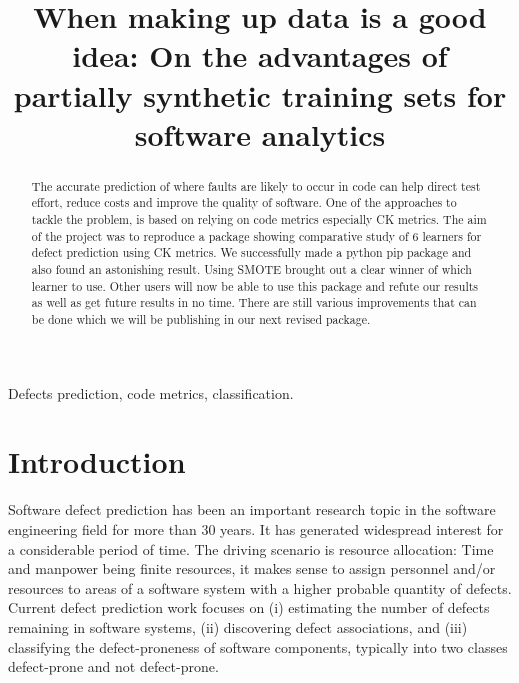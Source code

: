\documentclass[conference]{IEEEtran}
\begin{document}
\pagestyle{plain}

\title{When making up data is a good idea: On the advantages of partially synthetic training sets for software analytics}

\author{
\and
{}
}

\maketitle

\begin{abstract}
The accurate prediction of where faults are likely to occur in code can help direct test effort, reduce costs and improve the quality of software. One of the approaches to tackle the problem, is based on relying on code metrics especially CK metrics. The aim of the project was to reproduce a package showing comparative study of 6 learners for defect prediction using CK metrics. We successfully made a python pip package and also found an astonishing result. Using SMOTE brought out a clear winner of which learner to use. Other users will now be able to use this package and refute our results as well as get future results in no time. There are still various improvements that can be done which we will be publishing in our next revised package.
\end{abstract}

\begin{IEEEkeywords}
Defects prediction, code metrics, classification.
\end{IEEEkeywords}

\IEEEpeerreviewmaketitle

\section{Introduction}
Software defect prediction has been an important research topic in the software engineering field for more than 30 years. It has generated widespread interest for a
considerable period of time. The driving scenario is resource
allocation: Time and manpower being finite resources, it
makes sense to assign personnel and/or resources to areas of
a software system with a higher probable quantity of defects. Current defect prediction work focuses on (i) estimating the number of defects remaining in software systems, (ii) discovering defect associations, and (iii) classifying the defect-proneness of software components, typically into two classes defect-prone and not defect-prone. 
\end{document}
